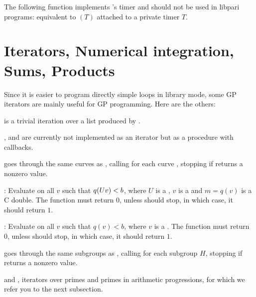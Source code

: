 


The following function implements 's timer and should not be used in
libpari programs:
 equivalent to $(T)$ attached to a
private timer $T$.

\section{Iterators, Numerical integration, Sums, Products}
Since it is easier to program directly simple loops in library mode, some GP
iterators are mainly useful for GP programming. Here are the others:

\item {} is a trivial iteration over a list produced by
.

\item {},  and  are currently not
implemented as an iterator but as a procedure with callbacks.

goes through the same curves as , calling
 for each curve , stopping if  returns a
nonzero value.

:
Evaluate  on all $v$ such that $q(U\*v)<b$, where $U$ is a
, $v$ is a  and $m=q(v)$ is a C double. The function
 must return $0$, unless  should stop, in which case,
it should return $1$.

:
Evaluate  on all $v$ such that $q(v)<b$, where $v$ is a
. The function  must return $0$, unless 
should stop, in which case, it should return $1$.

goes through the same subgroups as , calling
 for each subgroup $H$, stopping if  returns a
nonzero value.

\item {} and , iterators over primes and
primes in arithmetic progressions, for which we refer you to the
next subsection.

